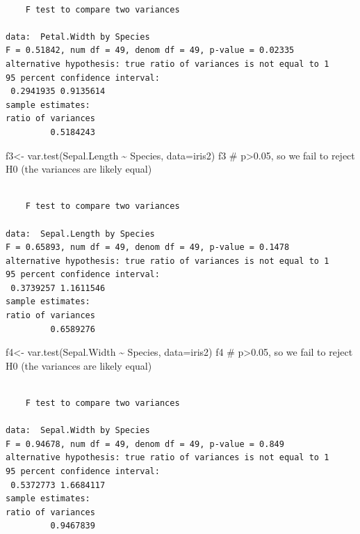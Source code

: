 \documentclass[
  letterpaper,
  DIV=11,
  numbers=noendperiod]{scrartcl}
\newenvironment{Shaded}{\begin{snugshade}}{\end{snugshade}}
\newcommand{\AttributeTok}[1]{\textcolor[rgb]{0.40,0.45,0.13}{#1}}
\newcommand{\CommentTok}[1]{\textcolor[rgb]{0.37,0.37,0.37}{#1}}
\newcommand{\FunctionTok}[1]{\textcolor[rgb]{0.28,0.35,0.67}{#1}}
\newcommand{\NormalTok}[1]{\textcolor[rgb]{0.00,0.23,0.31}{#1}}
\newcommand{\OtherTok}[1]{\textcolor[rgb]{0.00,0.23,0.31}{#1}}
\newcommand{\SpecialCharTok}[1]{\textcolor[rgb]{0.37,0.37,0.37}{#1}}
\begin{document}
\begin{verbatim}

    F test to compare two variances

data:  Petal.Width by Species
F = 0.51842, num df = 49, denom df = 49, p-value = 0.02335
alternative hypothesis: true ratio of variances is not equal to 1
95 percent confidence interval:
 0.2941935 0.9135614
sample estimates:
ratio of variances 
         0.5184243 
\end{verbatim}

\begin{Shaded}
\begin{Highlighting}[]
\NormalTok{f3}\OtherTok{\textless{}{-}} \FunctionTok{var.test}\NormalTok{(Sepal.Length }\SpecialCharTok{\textasciitilde{}}\NormalTok{ Species, }\AttributeTok{data=}\NormalTok{iris2)}
\NormalTok{f3 }\CommentTok{\# p\textgreater{}0.05, so we fail to reject H0 (the variances are likely equal)}
\end{Highlighting}
\end{Shaded}

\begin{verbatim}

    F test to compare two variances

data:  Sepal.Length by Species
F = 0.65893, num df = 49, denom df = 49, p-value = 0.1478
alternative hypothesis: true ratio of variances is not equal to 1
95 percent confidence interval:
 0.3739257 1.1611546
sample estimates:
ratio of variances 
         0.6589276 
\end{verbatim}

\begin{Shaded}
\begin{Highlighting}[]
\NormalTok{f4}\OtherTok{\textless{}{-}} \FunctionTok{var.test}\NormalTok{(Sepal.Width }\SpecialCharTok{\textasciitilde{}}\NormalTok{ Species, }\AttributeTok{data=}\NormalTok{iris2)}
\NormalTok{f4 }\CommentTok{\# p\textgreater{}0.05, so we fail to reject H0 (the variances are likely equal)}
\end{Highlighting}
\end{Shaded}

\begin{verbatim}

    F test to compare two variances

data:  Sepal.Width by Species
F = 0.94678, num df = 49, denom df = 49, p-value = 0.849
alternative hypothesis: true ratio of variances is not equal to 1
95 percent confidence interval:
 0.5372773 1.6684117
sample estimates:
ratio of variances 
         0.9467839 
\end{verbatim}
\end{document}
